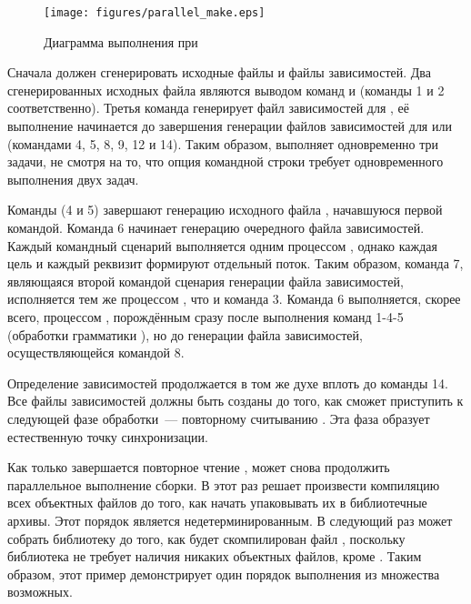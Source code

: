 \begin{figure}
\begin{center}
\texttt{[image: figures/parallel\_make.eps]}
\end{center}
\caption{Диаграмма выполнения \GNUmake{} при }
\label{fig:parallel_make}
\end{figure}

Сначала \GNUmake{} должен сгенерировать исходные файлы и файлы
зависимостей. Два сгенерированных исходных файла являются выводом
команд  и  (команды 1 и 2
соответственно). Третья команда генерирует файл зависимостей для
, её выполнение начинается до завершения
генерации файлов зависимостей для  или
 (командами 4, 5, 8, 9, 12 и 14). Таким образом,
\GNUmake{} выполняет одновременно три задачи, не смотря на то, что
опция командной строки требует одновременного выполнения двух задач.

Команды  (4 и 5) завершают генерацию исходного файла
, начавшуюся первой командой. Команда 6 начинает
генерацию очередного файла зависимостей. Каждый командный сценарий
выполняется одним процессом \GNUmake{}, однако каждая цель и каждый
реквизит формируют отдельный поток. Таким образом, команда 7,
являющаяся второй командой сценария генерации файла зависимостей,
исполняется тем же процессом \GNUmake{}, что и команда 3. Команда 6
выполняется, скорее всего, процессом \GNUmake{}, порождённым сразу
после выполнения команд 1-4-5 (обработки грамматики ),
но до генерации файла зависимостей, осуществляющейся командой 8.

Определение зависимостей продолжается в том же духе вплоть до команды
14. Все файлы зависимостей должны быть созданы до того, как \GNUmake{}
сможет приступить к следующей фазе обработки~--- повторному считыванию
. Эта фаза образует естественную точку синхронизации.

Как только завершается повторное чтение , \GNUmake{} может
снова продолжить параллельное выполнение сборки. В этот раз \GNUmake{}
решает произвести компиляцию всех объектных файлов до того, как начать
упаковывать их в библиотечные архивы. Этот порядок является
недетерминированным. В следующий раз \GNUmake{} может собрать
библиотеку  до того, как будет скомпилирован файл
, поскольку библиотека не требует наличия никаких
объектных файлов, кроме . Таким образом, этот пример
демонстрирует один порядок выполнения из множества возможных.

